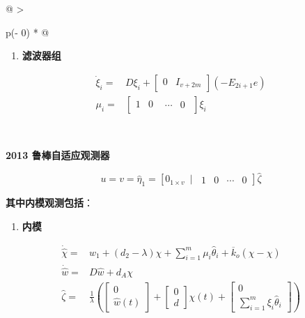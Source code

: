 \documentclass[
  12pt,
  a4paper
]{article}
\begin{document}
\begin{longtable}[]{@{}
  >{\raggedright\arraybackslash}p{}@{}}
\begin{minipage}[b]{\linewidth}
\begin{enumerate}
\def\labelenumi{\arabic{enumi}.}
\setcounter{enumi}{2}
\item
  \textbf{滤波器组}
\end{enumerate}

\[\begin{aligned}
{\dot{\xi}}_{i} = & D\xi_{i} + \begin{bmatrix}
0 & I_{v + 2m}
\end{bmatrix}( - E_{2i + 1}e) \\
\mu_{i} = & \begin{bmatrix}
1 & 0 & \begin{matrix}
\cdots & 0
\end{matrix}
\end{bmatrix}\xi_{i}
\end{aligned}\]
\end{minipage} \\
\midrule\noalign{}
\endhead
\bottomrule\noalign{}
\endlastfoot
\begin{minipage}[t]{\linewidth}\raggedright
\textbf{2013 鲁棒自适应观测器}

\[u = v = {\widehat{\eta}}_{1} = \left\lbrack 0_{1 \times v}\ \mid\ \begin{matrix}
1 & 0 & \cdots & 0
\end{matrix} \right\rbrack\widehat{\zeta}\]

\textbf{其中内模观测包括}：

\begin{enumerate}
\def\labelenumi{\arabic{enumi}.}
\item
  \textbf{内模}
\end{enumerate}

\[\begin{aligned}
\dot{\widehat{\chi}} = & w_{1} + \left( d_{2} - \lambda \right)\chi + \sum_{i = 1}^{m}{\mu_{i}{\widehat{\theta}}_{i}} + {\overline{k}}_{o}\left( \chi - \widehat{\chi} \right) \\
\dot{\widehat{w}} = & D\widehat{w} + d_{A}\chi \\
\widehat{\zeta} = & \frac{1}{\lambda}\left( \begin{bmatrix}
0 \\
\widehat{w}(t)
\end{bmatrix} + \begin{bmatrix}
0 \\
d
\end{bmatrix}\chi(t) + \begin{bmatrix}
0 \\
\sum_{i = 1}^{m}{\xi_{i}{\widehat{\theta}}_{i}}
\end{bmatrix} \right)
\end{aligned}\]


\end{minipage}
\end{longtable}
\end{document}
